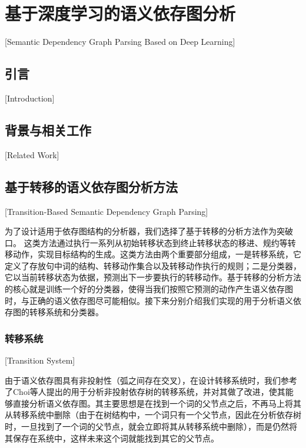 
\chapter[基于深度学习的语义依存图分析]{基于深度学习的语义依存图分析}[Semantic Dependency Graph Parsing Based on Deep Learning]

\section{引言}[Introduction]

\section{背景与相关工作}[Related Work]

\section{基于转移的语义依存图分析方法}[Transition-Based Semantic Dependency Graph Parsing]

为了设计适用于依存图结构的分析器，我们选择了基于转移的分析方法作为突破口。
这类方法通过执行一系列从初始转移状态到终止转移状态的移进、规约等转移动作，实现目标结构的生成。这类方法由两个重要部分组成，一是转移系统，它定义了存放句中词的结构、转移动作集合以及转移动作执行的规则；二是分类器，它以当前转移状态为依据，预测出下一步要执行的转移动作。基于转移的分析方法的核心就是训练一个好的分类器，使得当我们按照它预测的动作产生语义依存图时，与正确的语义依存图尽可能相似。接下来分别介绍我们实现的用于分析语义依存图的转移系统和分类器。

\subsection{转移系统}[Transition System]

由于语义依存图具有非投射性（弧之间存在交叉），在设计转移系统时，我们参考了Choi等人提出的用于分析非投射依存树的转移系统，\cite{choi-palmer:2011:ACL-HLT2011,choi-mccallum:2013:ACL2013}并对其做了改进，使其能够直接分析语义依存图。其主要思想是在找到一个词的父节点之后，不再马上将其从转移系统中删除（由于在树结构中，一个词只有一个父节点，因此在分析依存树时，一旦找到了一个词的父节点，就会立即将其从转移系统中删除），而是仍然将其保存在系统中，这样未来这个词就能找到其它的父节点。

